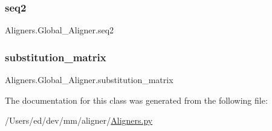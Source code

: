 \subsubsection{\texorpdfstring{seq2}{seq2}}
{\footnotesize\ttfamily Aligners.\+Global\+\_\+\+Aligner.\+seq2}

\mbox{\label{class_aligners_1_1_global___aligner_a718075378ef694647d0f4c42ecb7adf9}} 
\subsubsection{\texorpdfstring{substitution\+\_\+matrix}{substitution\_matrix}}
{\footnotesize\ttfamily Aligners.\+Global\+\_\+\+Aligner.\+substitution\+\_\+matrix}



The documentation for this class was generated from the following file\+:\begin{DoxyCompactItemize}
\item 
/\+Users/ed/dev/mm/aligner/\hyperlink{_aligners_8py}{Aligners.\+py}\end{DoxyCompactItemize}
